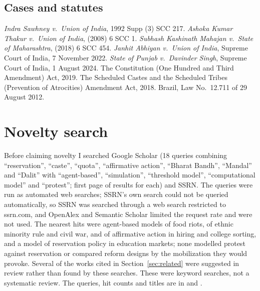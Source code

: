 \documentclass[11pt,a4paper]{article}
\begin{document}
\subsection*{Cases and statutes}
{\small
\emph{Indra Sawhney v.\ Union of India}, 1992 Supp (3) SCC 217. \emph{Ashoka Kumar Thakur v.\ Union of India}, (2008) 6 SCC 1. \emph{Subhash Kashinath Mahajan v.\ State of Maharashtra}, (2018) 6 SCC 454. \emph{Janhit Abhiyan v.\ Union of India}, Supreme Court of India, 7 November 2022. \emph{State of Punjab v.\ Davinder Singh}, Supreme Court of India, 1 August 2024. The Constitution (One Hundred and Third Amendment) Act, 2019. The Scheduled Castes and the Scheduled Tribes (Prevention of Atrocities) Amendment Act, 2018. Brazil, Law No.\ 12.711 of 29 August 2012.\par}

\appendix

\section{Novelty search}
\label{app:search}
Before claiming novelty I searched Google Scholar (18 queries combining ``reservation'', ``caste'', ``quota'', ``affirmative action'', ``Bharat Bandh'', ``Mandal'' and ``Dalit'' with ``agent-based'', ``simulation'', ``threshold model'', ``computational model'' and ``protest''; first page of results for each) and SSRN. The queries were run as automated web searches; SSRN's own search could not be queried automatically, so SSRN was searched through a web search restricted to ssrn.com, and OpenAlex and Semantic Scholar limited the request rate and were not used. The nearest hits were agent-based models of food riots, of ethnic minority rule and civil war, and of affirmative action in hiring and college sorting, and a model of reservation policy in education markets; none modelled protest against reservation or compared reform designs by the mobilization they would provoke. Several of the works cited in Section~\ref{sec:related} were suggested in review rather than found by these searches. These were keyword searches, not a systematic review. The queries, hit counts and titles are in  and .
\end{document}
